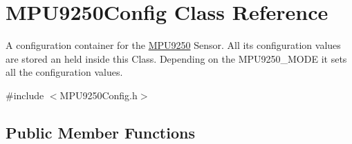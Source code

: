 \hypertarget{class_m_p_u9250_config}{}\section{M\+P\+U9250\+Config Class Reference}
\label{class_m_p_u9250_config}


A configuration container for the \hyperlink{class_m_p_u9250}{M\+P\+U9250} Sensor. All its configuration values are stored an held inside this Class. Depending on the M\+P\+U9250\+\_\+\+M\+O\+D\+E it sets all the configuration values.  




{\ttfamily \#include $<$M\+P\+U9250\+Config.\+h$>$}

\subsection*{Public Member Functions}
